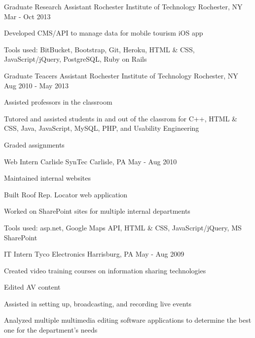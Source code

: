 \begin{cventries}
  \cventry
    {Graduate Research Assistant} %
    {Rochester Institute of Technology} %
    {Rochester, NY} %
    {Mar - Oct 2013} %
    {
      \begin{cvitems} %
        \item {Developed CMS/API to manage data for mobile tourism iOS app}
        \item {Tools used: BitBucket, Bootstrap, Git, Heroku, HTML \& CSS, JavaScript/jQuery, PostgreSQL, Ruby on Rails}
      \end{cvitems}
    }

  \cventry
    {Graduate Teacers Assistant}
    {Rochester Institute of Technology}
    {Rochester, NY}
    {Aug 2010 - May 2013}
    {
      \begin{cvitems}
        \item {Assisted professors in the classroom}
        \item {Tutored and assisted students in and out of the classrom for C++, HTML \& CSS, Java, JavaScript, MySQL, PHP, and Usability Engineering}
        \item {Graded assignments}
     \end{cvitems}
   }

  \cventry
    {Web Intern}
    {Carlisle SynTec}
    {Carlisle, PA}
    {May - Aug 2010}
    {
      \begin{cvitems}
        \item {Maintained internal websites}
        \item {Built Roof Rep. Locator web application}
        \item {Worked on SharePoint sites for multiple internal departments}
        \item {Tools used: asp.net, Google Maps API, HTML \& CSS, JavaScript/jQuery, MS SharePoint}
      \end{cvitems}
    }

  \cventry
    {IT Intern}
    {Tyco Electronics}
    {Harrisburg, PA}
    {May - Aug 2009}
    {
      \begin{cvitems}
        \item {Created video training courses on information sharing technologies}
        \item {Edited AV content}
        \item {Assisted in setting up, broadcasting, and recording live events}
        \item {Analyzed multiple multimedia editing software applications to determine the best one for the department's needs}
      \end{cvitems}
    }


\end{cventries}
